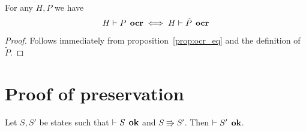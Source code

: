 \begin{proposition} \label{prop:ocrtilde_eq}
  For any $H, P$ we have
  \begin{equation*}
    H \vdash P \:\: \mbox{\bf ocr} \iff H \vdash \tilde{P} \:\: \mbox{\bf ocr}
  \end{equation*}
\end{proposition}
\begin{proof}
  Follows immediately from proposition~\ref{prop:ocr_eq} and the definition of
  $\tilde{P}$.
\end{proof}


\section{Proof of preservation}
\label{sec:proof_of_preservation}

\begin{theorem*}[Preservation]
  Let $S, S'$ be states such that $\vdash S \:\: \mbox{\bf ok}$ and $S \Rrightarrow
  S'$. Then $\vdash S' \:\: \mbox{\bf ok}$.
\end{theorem*}

